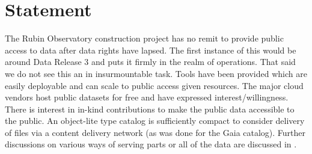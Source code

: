 
\section{Statement}

The Rubin Observatory construction project has no remit to provide public access to data after data rights have lapsed.
The first instance of this would be around Data Release 3 and puts it firmly in the realm of operations. That said we do not see this an in insurmountable task.
Tools have been provided which are easily deployable and can scale to public access given resources.  The major cloud vendors host public datasets for free and have expressed interest/willingness.
There is interest in in-kind contributions to make the public data  accessible to the public.
An object-lite type catalog is sufficiently compact to consider delivery of files via a content delivery network (as was done for the Gaia catalog). Further discussions on various ways of serving parts or all of the data are discussed in .

